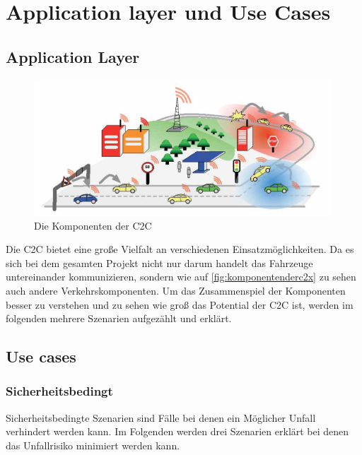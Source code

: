 \chapter{Application layer und Use Cases\label{chap:usecases}}
\section{Application Layer}
\begin{figure}[htbp]
\includegraphics[width=0.99\textwidth]{content/images/06_use_cases/komponenten.png}
\caption{Die Komponenten der \acl{C2C}}
\label{fig:komponentenderc2x}
\end{figure}
Die \acl{C2C} bietet eine große Vielfalt an verschiedenen Einsatzmöglichkeiten. Da es sich bei dem gesamten Projekt nicht nur darum handelt das Fahrzeuge untereinander kommunizieren, sondern wie auf \autoref{fig:komponentenderc2x} zu sehen auch andere Verkehrskomponenten. Um das Zusammenspiel der Komponenten besser zu verstehen und zu sehen wie groß das Potential der \acl{C2C} ist, werden im folgenden mehrere Szenarien aufgezählt und erklärt. 

\section{Use cases}
\subsection{Sicherheitsbedingt}
Sicherheitsbedingte Szenarien sind Fälle bei denen ein Möglicher Unfall verhindert werden kann. Im Folgenden werden drei Szenarien erklärt bei denen das Unfallrisiko minimiert werden kann.

